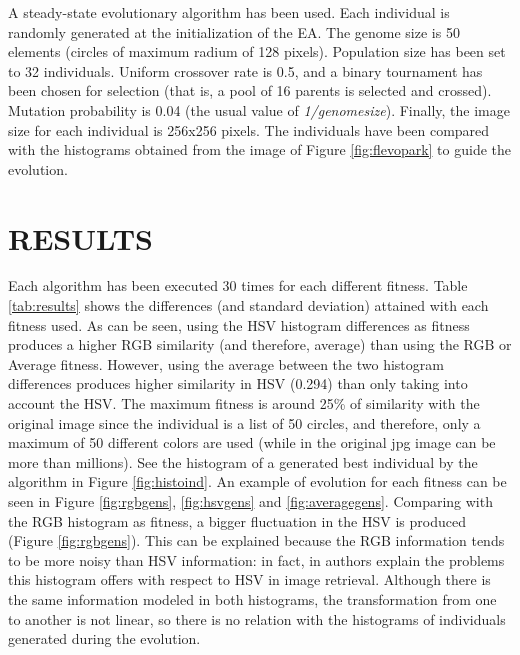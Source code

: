 \documentclass[a4paper,twoside]{article}
\begin{document}
A steady-state evolutionary algorithm has been used. Each individual is randomly generated at the initialization of the EA. The genome size is 50 elements (circles of maximum radium of 128 pixels). Population size has been set to 32 individuals. Uniform crossover rate is 0.5, and a binary tournament has been chosen for selection (that is, a pool of 16 parents is selected and crossed). Mutation probability is 0.04 (the usual value of {\em 1/genomesize}). Finally, the image size for each individual is 256x256 pixels. The individuals have been compared with the histograms obtained from the image of Figure \ref{fig:flevopark} to guide the evolution.

\section{\uppercase{RESULTS}}
\label{sec:results}

\noindent Each algorithm has been executed 30 times for each different fitness. Table \ref{tab:results} shows the differences (and standard deviation) attained with each fitness used. As can be seen, using the HSV histogram differences as fitness produces a higher RGB similarity (and therefore, average) than using the RGB or Average fitness. However, using the average between the two histogram differences produces higher similarity in HSV (0.294) than only taking into account the HSV. The maximum fitness is around 25\% of similarity with the original image since the individual is a list of 50 circles, and therefore, only a maximum of 50 different colors are used (while in the original jpg image can be more than millions). See the histogram of a generated best individual by the algorithm in Figure \ref{fig:histoind}. An example of evolution for each fitness can be seen in Figure \ref{fig:rgbgens}, \ref{fig:hsvgens} and \ref{fig:averagegens}. Comparing with the RGB histogram as fitness, a bigger fluctuation in the HSV is produced (Figure \ref{fig:rgbgens}). This can be explained because the RGB information tends to be more noisy than HSV information: in fact, in \cite{COLORDIFFERENCES} authors explain the problems this histogram offers with respect to HSV in image retrieval. Although there is the same information modeled in both histograms, the transformation from one to another is not linear, so there is no relation with the histograms of individuals generated during the evolution.
\end{document}
